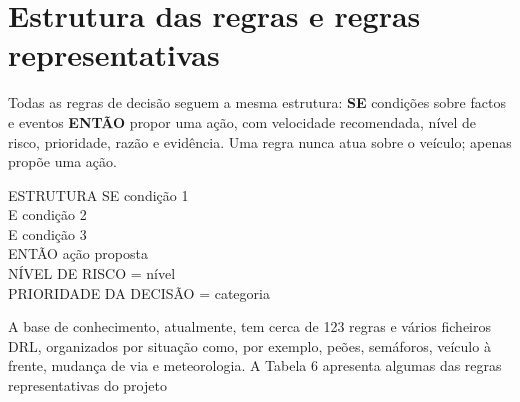 \section{Estrutura das regras e regras representativas}\label{sec:regras}

Todas as regras de decisão seguem a mesma estrutura: \textbf{SE} condições sobre factos e eventos
\textbf{ENTÃO} propor uma ação, com velocidade recomendada, nível de risco, prioridade, razão e
evidência. Uma regra nunca atua sobre o veículo; apenas propõe uma ação.

\begin{regranl}{ESTRUTURA}
SE    condição 1\\
E     condição 2\\
E     condição 3\\
ENTÃO ação proposta\\
\hspace*{3.2em}NÍVEL DE RISCO = nível\\
\hspace*{3.2em}PRIORIDADE DA DECISÃO = categoria
\end{regranl}

A base de conhecimento, atualmente, tem cerca de 123 regras e vários ficheiros DRL, organizados por situação como, por exemplo, peões, semáforos, veículo à frente, mudança de via e meteorologia. A Tabela 6 apresenta algumas das regras representativas do projeto

